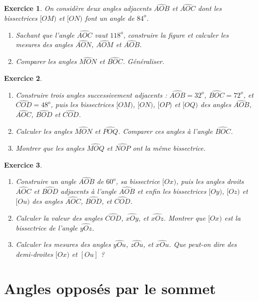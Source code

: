 \documentclass[12 pt]{article}
\theoremstyle{plain}
\newcounter{n}
\numberwithin{n}{section}
\newtheorem{exo}{Exercice}
\begin{document}
\begin{exo}
On considère deux angles adjacents $\widehat{AOB}$ et $\widehat{AOC}$ dont les bissectrices $[OM)$ et $[ON)$ font un angle de $84^o$. \begin{enumerate}
\item Sachant que l'angle $\widehat{AOC}$ vaut $118^o$, construire la figure et calculer les mesures des angles $\widehat{AON}$, $\widehat{AOM}$ et $\widehat{AOB}$. 
\item Comparer les angles $\widehat{MON}$ et $\widehat{BOC}$. Généraliser.
\end{enumerate}
\end{exo}

\begin{exo}\begin{enumerate}
\item Construire trois angles successivement adjacents : $\widehat{AOB}= 32^o$, $\widehat{BOC}= 72^o$, et $\widehat{COD}= 48^o$, puis les bissectrices $[OM)$, $[ON)$, $[OP)$ et $[OQ)$ des angles $\widehat{AOB}$, $\widehat{AOC}$, $\widehat{BOD}$ et $\widehat{COD}$. 
\item Calculer les angles $\widehat{MON}$ et $\widehat{POQ}$. Comparer
ces angles à l'angle $\widehat{BOC}$. 
\item Montrer que les angles $\widehat{MOQ}$ et $\widehat{NOP}$ ont la même bissectrice. 
\end{enumerate}\end{exo}

\begin{exo}\begin{enumerate}
\item Construire un angle $\widehat{AOB}$ de $60^o$, sa bissectrice $[Ox)$, puis les angles droits $\widehat{AOC}$ et $\widehat{BOD}$ adjacents à l'angle $\widehat{AOB}$ et enfin les bissectrices $[Oy)$, $[Oz)$ et $[Ou)$ des angles $\widehat{AOC}$, $\widehat{BOD}$, et $\widehat{COD}$. 
\item Calculer la valeur des angles $\widehat{COD}$, $\widehat{xOy}$, et $\widehat{xOz}$. Montrer que $[Ox)$ est la bissectrice de l'angle $\widehat{yOz}$. 
\item Calculer les mesures des angles $\widehat{yOu}$, $\widehat{zOu}$, et $\widehat{xOu}$. Que peut-on dire des demi-droites $[Ox)$ et $[Ou]$ ? 
\end{enumerate}
\end{exo}

\section{Angles opposés par le sommet }
\end{document}
